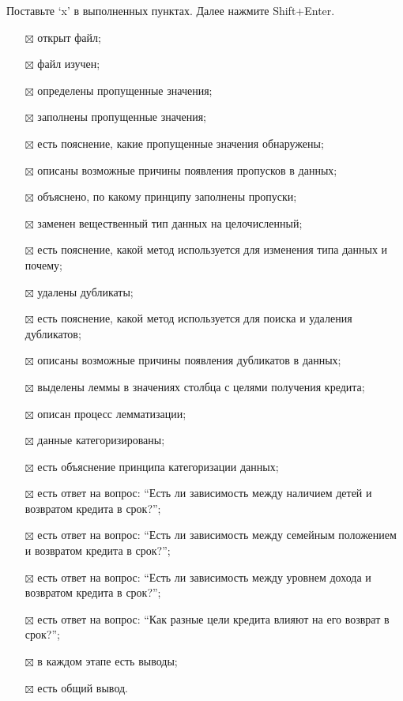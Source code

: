 \documentclass[11pt]{article}
\providecommand{\tightlist}{%
      \setlength{\itemsep}{0pt}\setlength{\parskip}{0pt}}
\begin{document}
Поставьте `x' в выполненных пунктах. Далее нажмите Shift+Enter.

    \begin{itemize}
\tightlist
\item[$\boxtimes$]
  открыт файл;
\item[$\boxtimes$]
  файл изучен;
\item[$\boxtimes$]
  определены пропущенные значения;
\item[$\boxtimes$]
  заполнены пропущенные значения;
\item[$\boxtimes$]
  есть пояснение, какие пропущенные значения обнаружены;
\item[$\boxtimes$]
  описаны возможные причины появления пропусков в данных;
\item[$\boxtimes$]
  объяснено, по какому принципу заполнены пропуски;
\item[$\boxtimes$]
  заменен вещественный тип данных на целочисленный;
\item[$\boxtimes$]
  есть пояснение, какой метод используется для изменения типа данных и
  почему;
\item[$\boxtimes$]
  удалены дубликаты;
\item[$\boxtimes$]
  есть пояснение, какой метод используется для поиска и удаления
  дубликатов;
\item[$\boxtimes$]
  описаны возможные причины появления дубликатов в данных;
\item[$\boxtimes$]
  выделены леммы в значениях столбца с целями получения кредита;
\item[$\boxtimes$]
  описан процесс лемматизации;
\item[$\boxtimes$]
  данные категоризированы;
\item[$\boxtimes$]
  есть объяснение принципа категоризации данных;
\item[$\boxtimes$]
  есть ответ на вопрос: ``Есть ли зависимость между наличием детей и
  возвратом кредита в срок?'';
\item[$\boxtimes$]
  есть ответ на вопрос: ``Есть ли зависимость между семейным положением
  и возвратом кредита в срок?'';
\item[$\boxtimes$]
  есть ответ на вопрос: ``Есть ли зависимость между уровнем дохода и
  возвратом кредита в срок?'';
\item[$\boxtimes$]
  есть ответ на вопрос: ``Как разные цели кредита влияют на его возврат
  в срок?'';
\item[$\boxtimes$]
  в каждом этапе есть выводы;
\item[$\boxtimes$]
  есть общий вывод.
\end{itemize}
\end{document}

